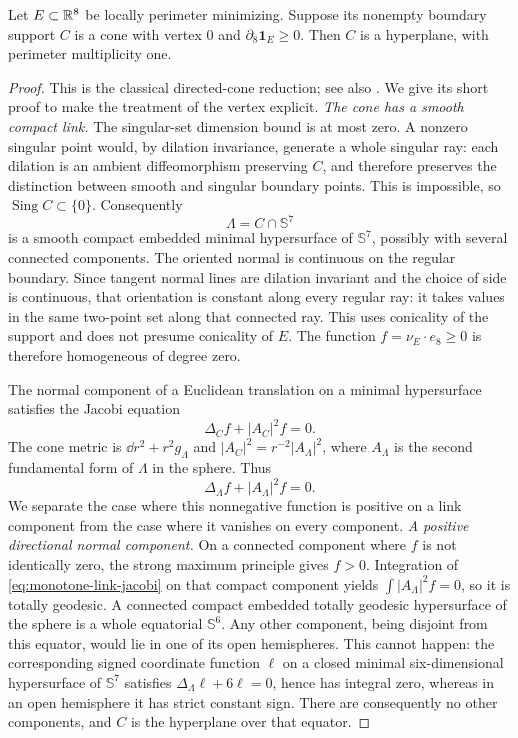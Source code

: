 \begin{lemma}
\label{lem:monotone-flat-cone}
Let $E\subset\mathbb R^8$ be locally perimeter minimizing.  Suppose its
nonempty boundary support $C$ is a cone with vertex $0$ and
$\partial_8\mathbf1_E\ge0$.  Then $C$ is a hyperplane, with
perimeter multiplicity one.
\end{lemma}

\begin{proof}
This is the classical directed-cone reduction; see also
\citet[Theorem~4.5 and Corollary~4.6]{Schnuerer2003}.  We give its
short proof to make the treatment of the vertex explicit.
\emph{The cone has a smooth compact link.}
The singular-set dimension bound is at most zero.  A nonzero singular
point would, by dilation invariance, generate a whole singular ray:
each dilation is an ambient diffeomorphism preserving $C$, and therefore
preserves the distinction between smooth and singular boundary points.
This is impossible, so $\operatorname{Sing}C\subset\{0\}$.
Consequently
\[
 \Lambda=C\cap\mathbb S^7
\]
is a smooth compact embedded minimal hypersurface of $\mathbb S^7$,
possibly with several connected components.  The oriented normal is
continuous on the regular boundary.  Since tangent normal lines are
dilation invariant and the choice of side is continuous, that orientation
is constant along every regular ray: it takes values in the same
two-point set along that connected ray.  This uses conicality of the
support and does not presume conicality of $E$.  The function
$f=\nu_E\cdot e_8\ge0$ is therefore homogeneous of degree zero.

The normal component of a Euclidean translation on a minimal hypersurface
satisfies the Jacobi equation
\citep[Corollary~3.3.1, p.~74]{Simons1968}
\[
 \Delta_C f+|A_C|^2f=0.
\]
The cone metric is $\dd r^2+r^2g_\Lambda$ and
$|A_C|^2=r^{-2}|A_\Lambda|^2$, where $A_\Lambda$ is the second
fundamental form of $\Lambda$ in the sphere.  Thus
\begin{equation}
 \Delta_\Lambda f+|A_\Lambda|^2f=0.
 \label{eq:monotone-link-jacobi}
\end{equation}
We separate the case where this nonnegative function is positive on a
link component from the case where it vanishes on every component.
\emph{A positive directional normal component.}
On a connected component where $f$ is not identically zero, the strong
maximum principle gives $f>0$.  Integration of
\eqref{eq:monotone-link-jacobi} on that compact component yields
$\int|A_\Lambda|^2f=0$, so it is totally geodesic.  A connected
compact embedded totally geodesic hypersurface of the sphere is a whole
equatorial $\mathbb S^6$.  Any other component, being disjoint from
this equator, would lie in one of its open hemispheres.  This cannot
happen: the corresponding signed coordinate function $\ell$ on a
closed minimal six-dimensional hypersurface of $\mathbb S^7$ satisfies
$\Delta_\Lambda\ell+6\ell=0$, hence has integral zero, whereas in
an open hemisphere it has strict constant sign.  There are consequently
no other components, and $C$ is the hyperplane over that equator.


\end{proof}
